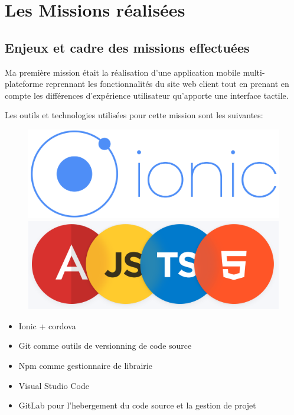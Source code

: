 \chapter{Les Missions réalisées}
\section{Enjeux et cadre des missions effectuées}
Ma première mission était la réalisation d'une application mobile multi-plateforme 
reprennant les fonctionnalités du site web client tout en prenant en compte 
les différences d'expérience utilisateur qu'apporte une interface tactile.\newline

Les outils et technologies utilisées pour cette mission sont les suivantes:

\begin{figure}[!h]
    \centering
    \begin{minipage}[b]{0.4\textwidth}
      \includegraphics[width=\textwidth]{Images/ionic-logo}
    \end{minipage}
    \hfill
    \begin{minipage}[b]{0.4\textwidth}
      \includegraphics[width=\textwidth]{Images/ajsthtml5}
    \end{minipage}
  \end{figure}

\begin{itemize}
    \item Ionic + cordova
    \item Git comme outils de versionning de code source
    \item Npm comme gestionnaire de librairie 
    \item Visual Studio Code
    \item GitLab pour l'hebergement du code source et la gestion de projet \newline
\end{itemize} 

